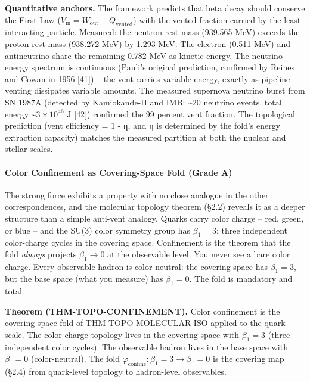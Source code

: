 \documentclass[
  11pt,
]{article}
\begin{document}
\textbf{Quantitative anchors.} The framework predicts that beta decay
should conserve the First Law
(\(V_{\text{in}} = W_{\text{out}} + Q_{\text{vented}}\)) with the vented
fraction carried by the least-interacting particle. Measured: the
neutron rest mass (939.565 MeV) exceeds the proton rest mass (938.272
MeV) by 1.293 MeV. The electron (0.511 MeV) and antineutrino share the
remaining 0.782 MeV as kinetic energy. The neutrino energy spectrum is
continuous (Pauli's original prediction, confirmed by Reines and Cowan
in 1956 {[}41{]}) -- the vent carries variable energy, exactly as
pipeline venting dissipates variable amounts. The measured supernova
neutrino burst from SN 1987A (detected by Kamiokande-II and IMB:
\textasciitilde20 neutrino events, total energy
\textasciitilde{}\(3 \times 10^{46}\) J {[}42{]}) confirmed the 99
percent vent fraction. The topological prediction (vent efficiency = 1 -
η, and η is determined by the fold's energy extraction capacity) matches
the measured partition at both the nuclear and stellar scales.

\paragraph{Color Confinement as Covering-Space Fold (Grade
A)}\label{color-confinement-as-covering-space-fold-grade-a}

The strong force exhibits a property with no close analogue in the other
correspondences, and the molecular topology theorem (§2.2) reveals it as
a deeper structure than a simple anti-vent analogy. Quarks carry color
charge -- red, green, or blue -- and the SU(3) color symmetry group has
\(\beta_1 = 3\): three independent color-charge cycles in the covering
space. Confinement is the theorem that the fold \emph{always} projects
\(\beta_1 \to 0\) at the observable level. You never see a bare color
charge. Every observable hadron is color-neutral: the covering space has
\(\beta_1 = 3\), but the base space (what you measure) has
\(\beta_1 = 0\). The fold is mandatory and total.

\textbf{Theorem (THM-TOPO-CONFINEMENT).} Color confinement is the
covering-space fold of THM-TOPO-MOLECULAR-ISO applied to the quark
scale. The color-charge topology lives in the covering space with
\(\beta_1 = 3\) (three independent color cycles). The observable hadron
lives in the base space with \(\beta_1 = 0\) (color-neutral). The fold
\(\varphi_{\text{confine}}: \beta_1 = 3 \to \beta_1 = 0\) is the
covering map (§2.4) from quark-level topology to hadron-level
observables.
\end{document}
